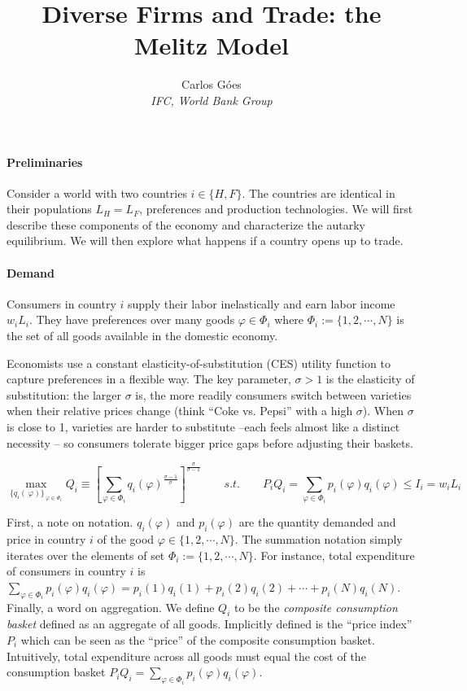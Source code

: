 \documentclass[11pt,letterpaper]{article}
\begin{document}
\title{\textbf{Diverse Firms and Trade: the Melitz Model}}
\author{\large%
\setcounter{footnote}{0}%
Carlos G\'{o}es \\[-3pt] \textit{\small IFC, World Bank Group}
}
\maketitle

\paragraph{Preliminaries} Consider a world with two countries $i \in \{H,F \}$. The countries are identical in their populations $L_H=L_F$, preferences and production technologies. We will first describe these components of the economy and characterize the autarky equilibrium. We will then explore what happens if a country opens up to trade. 

\paragraph{Demand} Consumers in country $i$ supply their labor inelastically and earn labor income $w_i L_i$. They have preferences over many goods $\varphi \in \Phi_i$ where $\Phi_i := \{1,2,\cdots, N\}$ is the set of all goods available in the domestic economy.

Economists use a constant elasticity-of-substitution (CES) utility function to capture preferences in a flexible way. The key parameter,  $\sigma > 1$ is the elasticity of substitution: the larger $\sigma$ is, the more readily consumers switch between varieties when their relative prices change (think “Coke vs. Pepsi” with a high $\sigma$). When $\sigma$ is close to 1, varieties are harder to substitute --each feels almost like a distinct necessity -- so consumers tolerate bigger price gaps before adjusting their baskets.

\begin{equation*}
    \max_{\{q_i(\
\varphi)\}_{\
\varphi \in \Phi_i}} Q_i \equiv \left[ \sum_{\varphi \in \Phi_i } q_i(
\varphi)^{\tfrac{\sigma-1}{\sigma}} \right]^{\tfrac{\sigma}{\sigma-1} } \qquad s.t. \qquad  P_i Q_i =\sum_{\varphi \in \Phi_i } p_i(\varphi) q_i(\varphi) \le I_i = w_i L_i 
\end{equation*}

First, a note on notation. $q_i(\varphi)$ and $p_i(\varphi)$ are the quantity demanded and price in country $i$ of the good $\varphi \in \{1, 2, \cdots, N\}$. The summation notation simply iterates over the elements of set $\Phi_i:=\{1, 2, \cdots, N\}$. For instance,  total expenditure of consumers in country $i$ is  $\sum_{\varphi \in \Phi_i } p_i(\varphi) q_i(\varphi) = p_i(1) q_i(1) + p_i(2) q_i(2) + \cdots + p_i(N) q_i(N)$. Finally, a word on aggregation. We define $ Q_i$ to be the \textit{composite consumption basket}
defined as an aggregate of all goods. Implicitly defined is the ``price index'' $P_i$ which can be seen as the ``price'' of the composite consumption basket. Intuitively, total expenditure across all goods must equal the cost of the consumption basket $P_i Q_i =\sum_{\varphi \in \Phi_i } p_i(\varphi) q_i(\varphi)$.
\end{document}
